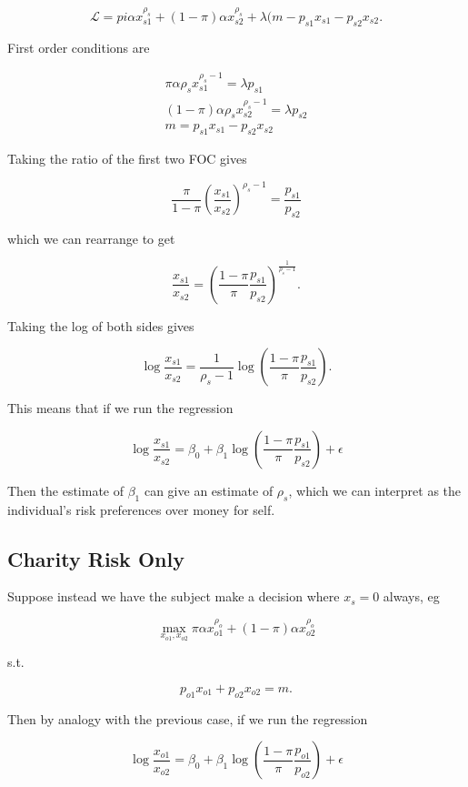 \documentclass[11pt]{article}
\begin{document}
\[
\mathcal L = pi \alpha x_{s1}^{\rho_s} + (1-\pi) \alpha x_{s2}^{\rho_s}  + \lambda (m - p_{s1} x_{s1} - p_{s2} x_{s2}.
\]

First order conditions are

\begin{eqnarray}
\pi \alpha \rho_s x_{s1}^{\rho_s-1} = \lambda p_{s1} \\
(1-\pi) \alpha \rho_s x_{s2}^{\rho_s-1} = \lambda p_{s2}  \\
m = p_{s1} x_{s1} - p_{s2} x_{s2}
\end{eqnarray}

Taking the ratio of the first two FOC gives

\[
\frac{\pi}{1-\pi} \left ( \frac{x_{s1}}{x_{s2}} \right ) ^{\rho_s-1} = \frac{p_{s1}}{p_{s2}}
\]

which we can rearrange to get

\[
 \frac{x_{s1}}{x_{s2}} = \left ( \frac{1-\pi}{\pi} \frac{p_{s1}}{p_{s2}} \right )^{\frac{1}{\rho_s-1}}.
\]

Taking the log of both sides gives

\[
\log \frac{x_{s1}}{x_{s2}} =  \frac{1}{\rho_s-1} \log \left ( \frac{1-\pi}{\pi} \frac{p_{s1}}{p_{s2}} \right ).
\]

This means that if we run the regression

\[
\log \frac{x_{s1}}{x_{s2}} = \beta_0 + \beta_1 \log \left ( \frac{1-\pi}{\pi} \frac{p_{s1}}{p_{s2}} \right ) + \epsilon
\]

Then the estimate of $\beta_1$ can give an estimate of $\rho_s$, which we can interpret as the individual's risk preferences over money for self.

\subsection{Charity Risk Only}

Suppose instead we have the subject make a decision where $x_s = 0$ always, eg

\[
\max_{x_{o1}, x_{o2}} \pi \alpha x_{o1}^{\rho_o} + (1-\pi) \alpha x_{o2}^{\rho_o} 
\]

s.t.

\[
p_{o1} x_{o1} + p_{o2} x_{o2}  = m.
\]

Then by analogy with the previous case, if we run the regression

\[
\log \frac{x_{o1}}{x_{o2}} = \beta_0 + \beta_1 \log \left ( \frac{1-\pi}{\pi} \frac{p_{o1}}{p_{o2}} \right ) + \epsilon
\]
\end{document}
